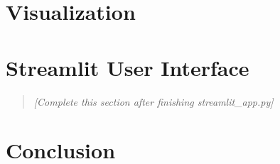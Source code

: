 \documentclass[12pt, letterpaper]{article}
\begin{document}
\section{Visualization}
\label{sec:visualization}


\section{Streamlit User Interface}
\label{sec:ui}
\begin{quote}
    \textit{[Complete this section after finishing streamlit\_app.py]}
\end{quote}

\section{Conclusion}
\label{sec:conclusion}


\newpage
\printbibliography[title={References}]
\end{document}
